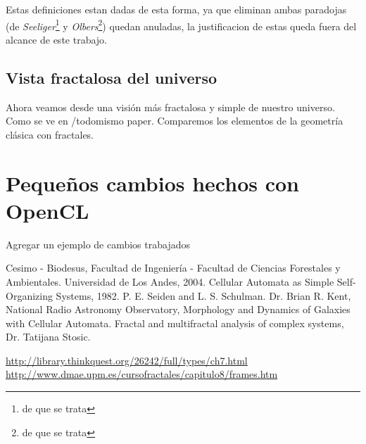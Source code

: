 \documentclass[12tp]{article}
\begin{document}
Estas definiciones estan dadas de esta forma, ya que eliminan ambas paradojas (de \emph{Seeliger}\footnote{de que se trata} y \emph{Olbers}\footnote{de que se trata}) quedan 
anuladas, la justificacion de estas queda fuera del alcance de este trabajo.
\subsection{Vista fractalosa del universo}

Ahora veamos desde una visión más fractalosa y simple de nuestro universo. Como se ve en /todo{mismo paper}. Comparemos los elementos
de la geometría clásica con fractales.

\section{Pequeños cambios hechos con OpenCL}
Agregar un ejemplo de cambios trabajados

\begin{small}
\begin{thebibliography}{1}
 Cesimo - Biodesus, Facultad de Ingeniería - Facultad de Ciencias Forestales y Ambientales. Universidad de Los Andes, 2004.
 Cellular Automata as Simple Self-Organizing Systems, 1982.
 P. E. Seiden and L. S. Schulman.
Dr. Brian R. Kent, National	Radio Astronomy Observatory, Morphology and Dynamics of Galaxies with Cellular Automata.
Fractal and multifractal analysis of complex systems, Dr. Tatijana Stosic.
  
\url{http://library.thinkquest.org/26242/full/types/ch7.html}
\url{http://www.dmae.upm.es/cursofractales/capitulo8/frames.htm}
\end{thebibliography}
\end{small}
\end{document}
